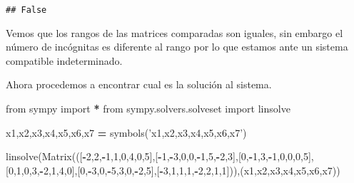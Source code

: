 \documentclass[
]{article}
\newenvironment{Shaded}{\begin{snugshade}}{\end{snugshade}}
\newcommand{\DecValTok}[1]{\textcolor[rgb]{0.00,0.00,0.81}{#1}}
\newcommand{\ImportTok}[1]{#1}
\newcommand{\NormalTok}[1]{#1}
\newcommand{\OperatorTok}[1]{\textcolor[rgb]{0.81,0.36,0.00}{\textbf{#1}}}
\newcommand{\StringTok}[1]{\textcolor[rgb]{0.31,0.60,0.02}{#1}}
\begin{document}
\begin{verbatim}
## False
\end{verbatim}

Vemos que los rangos de las matrices comparadas son iguales, sin embargo
el número de incógnitas es diferente al rango por lo que estamos ante un
sistema compatible indeterminado.

Ahora procedemos a encontrar cual es la solución al sistema.

\begin{Shaded}
\begin{Highlighting}[]
\ImportTok{from}\NormalTok{ sympy }\ImportTok{import} \OperatorTok{*}
\ImportTok{from}\NormalTok{ sympy.solvers.solveset }\ImportTok{import}\NormalTok{ linsolve}

\NormalTok{x1,x2,x3,x4,x5,x6,x7 }\OperatorTok{=}\NormalTok{ symbols(}\StringTok{'x1,x2,x3,x4,x5,x6,x7'}\NormalTok{)}

\NormalTok{linsolve(Matrix(([}\OperatorTok{-}\DecValTok{2}\NormalTok{,}\DecValTok{2}\NormalTok{,}\OperatorTok{-}\DecValTok{1}\NormalTok{,}\DecValTok{1}\NormalTok{,}\DecValTok{0}\NormalTok{,}\DecValTok{4}\NormalTok{,}\DecValTok{0}\NormalTok{,}\DecValTok{5}\NormalTok{],[}\OperatorTok{-}\DecValTok{1}\NormalTok{,}\OperatorTok{-}\DecValTok{3}\NormalTok{,}\DecValTok{0}\NormalTok{,}\DecValTok{0}\NormalTok{,}\OperatorTok{-}\DecValTok{1}\NormalTok{,}\DecValTok{5}\NormalTok{,}\OperatorTok{-}\DecValTok{2}\NormalTok{,}\DecValTok{3}\NormalTok{],[}\DecValTok{0}\NormalTok{,}\OperatorTok{-}\DecValTok{1}\NormalTok{,}\DecValTok{3}\NormalTok{,}\OperatorTok{-}\DecValTok{1}\NormalTok{,}\DecValTok{0}\NormalTok{,}\DecValTok{0}\NormalTok{,}\DecValTok{0}\NormalTok{,}\DecValTok{5}\NormalTok{],[}\DecValTok{0}\NormalTok{,}\DecValTok{1}\NormalTok{,}\DecValTok{0}\NormalTok{,}\DecValTok{3}\NormalTok{,}\OperatorTok{-}\DecValTok{2}\NormalTok{,}\DecValTok{1}\NormalTok{,}\DecValTok{4}\NormalTok{,}\DecValTok{0}\NormalTok{],[}\DecValTok{0}\NormalTok{,}\OperatorTok{-}\DecValTok{3}\NormalTok{,}\DecValTok{0}\NormalTok{,}\OperatorTok{-}\DecValTok{5}\NormalTok{,}\DecValTok{3}\NormalTok{,}\DecValTok{0}\NormalTok{,}\OperatorTok{-}\DecValTok{2}\NormalTok{,}\DecValTok{5}\NormalTok{],[}\OperatorTok{-}\DecValTok{3}\NormalTok{,}\DecValTok{1}\NormalTok{,}\DecValTok{1}\NormalTok{,}\DecValTok{1}\NormalTok{,}\OperatorTok{-}\DecValTok{2}\NormalTok{,}\DecValTok{2}\NormalTok{,}\DecValTok{1}\NormalTok{,}\DecValTok{1}\NormalTok{])),(x1,x2,x3,x4,x5,x6,x7))}
\end{Highlighting}
\end{Shaded}
\end{document}
